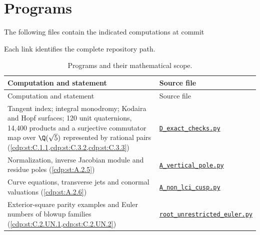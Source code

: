 \section*{Programs}
The following files contain the indicated computations at commit
\begin{center}\small\ttfamily\SsixRepositoryCommit\end{center}
Each link identifies the complete repository path.

{\footnotesize
\renewcommand{\arraystretch}{.9}
\setlength{\tabcolsep}{4pt}
\begin{longtable}{@{}>{\raggedright\arraybackslash}p{}>{\raggedright\arraybackslash}p{}@{}}
\caption{Programs and their mathematical scope.}\label{tab:II:programs}\\
\toprule Computation and statement & Source file \\
\midrule\endfirsthead
\toprule Computation and statement & Source file \\
\midrule\endhead
\bottomrule\endfoot
Tangent index; integral monodromy; Kodaira and Hopf surfaces; 120 unit quaternions, 14,400 products and a surjective commutator map over $\Q(\sqrt5)$ represented by rational pairs (\cref{cdp:st:C.1.1,cdp:st:C.3.2,cdp:st:C.3.3}) & \href{https://raw.githubusercontent.com/KokunoYumeto/s6-complex-structure-workbench/\SsixRepositoryCommit/pro_returns/S6_03_CDP_checkpoint_13_20261116T0136Z/S6_03_CDP/code/D_exact_checks.py}{\nolinkurl{D_exact_checks.py}} \\[3pt]
Normalization, inverse Jacobian module and residue poles (\cref{cdp:st:A.2.5}) & \href{https://raw.githubusercontent.com/KokunoYumeto/s6-complex-structure-workbench/\SsixRepositoryCommit/pro_returns/S6_03_CDP_checkpoint_13_20261116T0136Z/S6_03_CDP/code/A_vertical_pole.py}{\nolinkurl{A_vertical_pole.py}} \\[3pt]
Curve equations, transverse jets and conormal valuations (\cref{cdp:st:A.2.6}) & \href{https://raw.githubusercontent.com/KokunoYumeto/s6-complex-structure-workbench/\SsixRepositoryCommit/pro_returns/S6_03_CDP_checkpoint_13_20261116T0136Z/S6_03_CDP/code/A_non_lci_cusp.py}{\nolinkurl{A_non_lci_cusp.py}} \\[3pt]
Exterior-square parity examples and Euler numbers of blowup families (\cref{cdp:st:C.2.UN.1,cdp:st:C.2.UN.2}) & \href{https://raw.githubusercontent.com/KokunoYumeto/s6-complex-structure-workbench/\SsixRepositoryCommit/pro_returns/S6_03_CDP_checkpoint_13_20261116T0136Z/S6_03_CDP/code/root_unrestricted_euler.py}{\nolinkurl{root_unrestricted_euler.py}} \\[3pt]

\end{longtable}}
